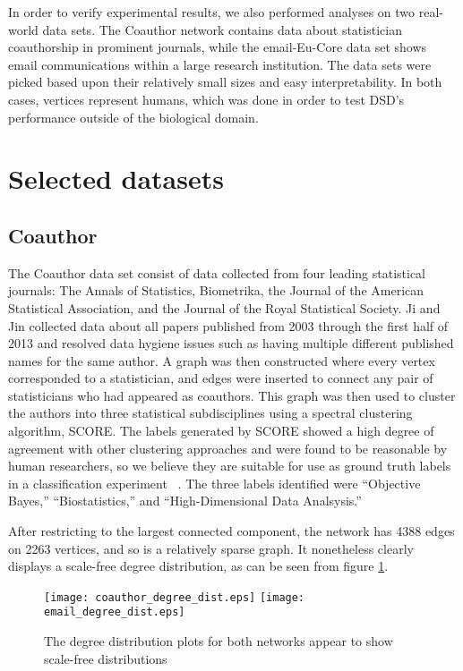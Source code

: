 In order to verify experimental results, we also performed analyses on two real-world data sets. The
Coauthor network contains data about statistician coauthorship in prominent journals, while the
email-Eu-Core data set shows email communications within a large research institution. The data sets
were picked based upon their relatively small sizes and easy interpretability. In both cases,
vertices represent humans, which was done in order to test DSD's performance outside of the
biological domain.


\section{Selected datasets}

\subsection{Coauthor}

The Coauthor data set consist of data collected from four leading statistical journals: The Annals
of Statistics, Biometrika, the Journal of the American Statistical Association, and the Journal of
the Royal Statistical Society. Ji and Jin collected data about all papers published from 2003
through the first half of 2013 and resolved data hygiene issues such as having multiple different
published names for the same author. A graph was then constructed where every vertex corresponded to
a statistician, and edges were inserted to connect any pair of statisticians who had appeared as
coauthors. This graph was then used to cluster the authors into three statistical subdisciplines
using a spectral clustering algorithm, SCORE. The labels generated by SCORE showed a high degree of
agreement with other clustering approaches and were found to be reasonable by human researchers, so
we believe they are suitable for use as ground truth labels in a classification experiment
~\cite{ji2016}. The three labels identified were ``Objective Bayes,'' ``Biostatistics,'' and
``High-Dimensional Data Analsysis.''

After restricting to the largest connected component, the network has 4388 edges on 2263 vertices,
and so is a relatively sparse graph. It nonetheless clearly displays a scale-free degree
distribution, as can be seen from figure \ref{fig:real_world_degree_dist}.

\begin{figure}
  \centering
  \texttt{[image: coauthor\_degree\_dist.eps]}
  \texttt{[image: email\_degree\_dist.eps]}
  \caption{The degree distribution plots for both networks appear to show scale-free distributions}
  \label{fig:real_world_degree_dist}
\end{figure}


